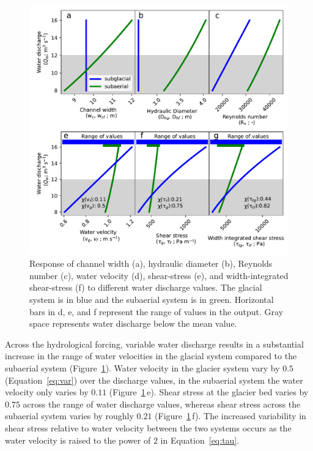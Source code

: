 \documentclass[11pt]{article}
\begin{document}
\begin{spacing}{1}
  \begin{center}
    \begin{figure}[H]
      \includegraphics[width=0.7\linewidth]{model_outputs.pdf}
      \caption{Response of channel width (a), hydraulic diameter (b),  Reynolds number  (c),  water velocity (d), shear-stress (e), and width-integrated shear-stress (f)  to different water discharge values. The glacial system is in blue and the subaerial system is in green.  Horizontal bars in d, e, and f represent the range of values in the  output. Gray space represents water discharge below the mean value. }
      \label{fig:model_outs}
    \end{figure}
  \end{center}
  
  Across the hydrological forcing, variable water discharge results in a substantial increase in the range of water velocities in the glacial system compared to the subaerial system (Figure~\ref{fig:model_outs}).
  Water velocity in the glacier system vary by  $0.5$ (Equation~\ref{eq:var}) over the discharge values, in the subaerial system the water velocity only varies by $0.11$ (Figure~\ref{fig:model_outs}\,e).
  Shear stress at the glacier bed varies by $0.75$ across the range of water discharge values, whereas shear stress across the subaerial system varies by roughly $0.21$ (Figure~\ref{fig:model_outs}\,f). The increased variability in shear stress relative to water velocity between the two systems occurs as the water velocity is raised to the power of $2$ in Equation~\ref{eq:tau}. 
  

\end{spacing}
\end{document}

